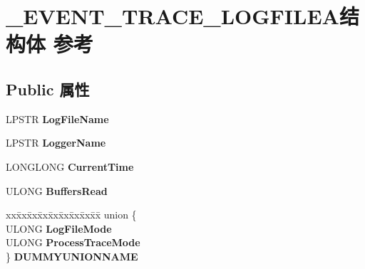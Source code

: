 \hypertarget{struct___e_v_e_n_t___t_r_a_c_e___l_o_g_f_i_l_e_a}{}\section{\+\_\+\+E\+V\+E\+N\+T\+\_\+\+T\+R\+A\+C\+E\+\_\+\+L\+O\+G\+F\+I\+L\+E\+A结构体 参考}
\label{struct___e_v_e_n_t___t_r_a_c_e___l_o_g_f_i_l_e_a}
\subsection*{Public 属性}
\begin{DoxyCompactItemize}
\item 
\mbox{\label{struct___e_v_e_n_t___t_r_a_c_e___l_o_g_f_i_l_e_a_a68df21672526ee48766a88a518e52a75}} 
L\+P\+S\+TR {\bfseries Log\+File\+Name}
\item 
\mbox{\label{struct___e_v_e_n_t___t_r_a_c_e___l_o_g_f_i_l_e_a_a858a10b84ce397a845202073a37e4454}} 
L\+P\+S\+TR {\bfseries Logger\+Name}
\item 
\mbox{\label{struct___e_v_e_n_t___t_r_a_c_e___l_o_g_f_i_l_e_a_a44c49d60ea8553b9a4459334de4ec125}} 
L\+O\+N\+G\+L\+O\+NG {\bfseries Current\+Time}
\item 
\mbox{\label{struct___e_v_e_n_t___t_r_a_c_e___l_o_g_f_i_l_e_a_a05558972b83aae8bbe2cd9150d7832eb}} 
U\+L\+O\+NG {\bfseries Buffers\+Read}
\item 
\mbox{\label{struct___e_v_e_n_t___t_r_a_c_e___l_o_g_f_i_l_e_a_a3bbd33a14302d3508f23265eb95ea2a1}} 
\begin{tabbing}
xx\=xx\=xx\=xx\=xx\=xx\=xx\=xx\=xx\=\kill
union \{\\
\>ULONG {\bfseries LogFileMode}\\
\>ULONG {\bfseries ProcessTraceMode}\\
\} {\bfseries DUMMYUNIONNAME}\\


\end{tabbing}
\end{DoxyCompactItemize}
